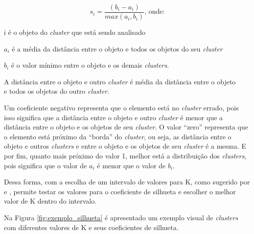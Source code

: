 \begin{equation} \label{eq:coeficiente}
  s_{i} = \frac{(b_{i} - a_{i})}{max(a_{i}, b_{i})} \mbox{, onde:}
\end{equation}

{\addtolength{\leftskip}{8mm}
    i é o objeto do \textit{cluster} que está sendo analisado
    
    $a_{i}$ é a média da distância entre o objeto e todos os objetos do seu \textit{cluster}
    
    $b_{i}$ é o valor mínimo entre o objeto e os demais \textit{clusters}. 
    
	  \footnotesize \indent \indent A distância entre o objeto e outro \textit{cluster} é média da distância entre o objeto \\ \indent \indent e todos os objetos do outro \textit{cluster}.
}

Um coeficiente negativo representa que o elemento está no \textit{cluster} errado, pois isso significa que a distância entre o objeto e outro \textit{cluster} 
é menor que a distância entre o objeto e os objetos de seu \textit{cluster}. O valor ``zero'' representa que o elemento está próximo da ``borda'' do \textit{cluster}, ou seja,
as distância entre o objeto e outros \textit{clusters} e entre o objeto e os objetos de seu \textit{cluster} é a mesma. E por fim, quanto mais próximo do valor 1, melhor
está a distribuição dos \textit{clusters}, pois significa que o valor de $a_i$ é menor que o valor de $b_i$.

Dessa forma, com a escolha de um intervalo de valores para K, como sugerido por  e , permite testar os valores para o coeficiente
de silhueta e escolher o melhor valor de K dentro do intervalo. 


Na Figura \ref{fig:exemplo_silhueta} é apresentado um exemplo visual de \textit{clusters} com diferentes valores
de K e seus coeficientes de silhueta.

